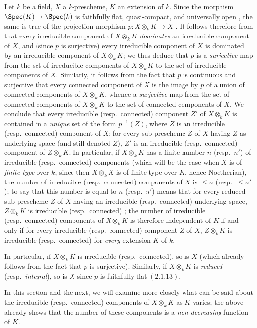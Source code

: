 \begin{env}[4.4.1]
\label{IV.4.4.1}
Let $k$ be a field, $X$ a $k$-prescheme, $K$ an extension of $k$.
Since the morphism $\Spec(K)\to\Spec(k)$ is faithfully flat, quasi-compact, and universally open , the same is true of the projection morphism $p:X\otimes_k K\to X$ .
It follows therefore from  that every irreducible component of $X\otimes_k K$ \emph{dominates} an irreducible component of $X$, and (since $p$ is surjective) every irreducible component of $X$ is dominated by an irreducible component of $X\otimes_k K$; we thus deduce that $p$ is a \emph{surjective} map from the set of irreducible components of $X\otimes_k K$ to the set of irreducible components of $X$.
Similarly, it follows from the fact that $p$ is continuous and surjective that every connected component of $X$ is the image by $p$ of a union of connected components of $X\otimes_k K$, whence a \emph{surjective} map from the set of connected components of $X\otimes_k K$ to the set of connected components of $X$.
We conclude that every irreducible (resp.\ connected) component $Z'$ of $X\otimes_k K$ is contained in a \emph{unique} set of the form $p^{-1}(Z)$, where $Z$ is an irreducible (resp.\ connected) component of $X$; for every sub-prescheme $Z$ of $X$ having $Z$ as underlying space (and still denoted $Z$), $Z'$ is an irreducible (resp.\ connected) component of $Z\otimes_k K$.
In particular, if $X\otimes_k K$ has a finite number $n$ (resp.\ $n'$) of irreducible (resp.\ connected) components (which will be the case when $X$ is of \emph{finite type} over $k$, since then $X\otimes_k K$ is of finite type over $K$, hence Noetherian), the number of irreducible (resp.\ connected) components of $X$ is $\leq n$ (resp.\ $\leq n'$); to say that this number is equal to $n$ (resp.\ $n'$) means that for every reduced sub-prescheme $Z$ of $X$ having an irreducible (resp.\ connected) underlying space, $Z\otimes_k K$ is irreducible (resp.\ connected) ; the number of irreducible (resp.\ connected) components of $X\otimes_k K$ is therefore independent of $K$ if and only if for every irreducible (resp.\ connected) component $Z$ of $X$, $Z\otimes_k K$ is irreducible (resp.\ connected) for \emph{every} extension $K$ of $k$.

In particular, if $X\otimes_k K$ is irreducible (resp.\ connected), so is $X$ (which already follows from the fact that $p$ is surjective).
Similarly, if $X\otimes_k K$ is \emph{reduced} (resp.\ \emph{integral}), so is $X$ since $p$ is faithfully flat $(2.1.13)$.

In this section and the next, we will examine more closely what can be said about the irreducible (resp.\ connected) components of $X\otimes_k K$ as $K$ varies; the above already shows that the number of these components is a \emph{non-decreasing} function of $K$.
\end{env}

